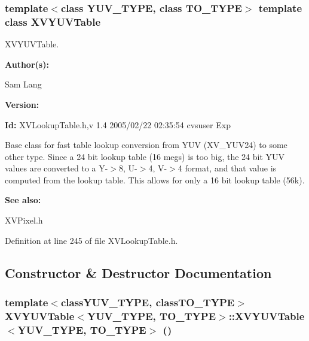 \subsubsection*{template$<$class YUV\_\-TYPE, class TO\_\-TYPE$>$  template class XVYUVTable}

XVYUVTable.

\begin{Desc}
\item[{\bf Author(s): }]\par
 Sam Lang \end{Desc}
\begin{Desc}
\item[{\bf Version: }]\par
 \end{Desc}
\begin{Desc}
\item[{\bf Id: }] XVLookup\-Table.h,v 1.4 2005/02/22 02:35:54 cvsuser Exp \end{Desc}


Base class for fast table lookup conversion from YUV (XV\_\-YUV24) to some other type. Since a 24 bit lookup table (16 megs) is too big, the 24 bit YUV values are converted to a Y-$>$8, U-$>$4, V-$>$4 format, and that value is computed from the lookup table. This allows for only a 16 bit lookup table (56k).

\begin{Desc}
\item[{\bf See also: }]\par
 XVPixel.h \end{Desc}




Definition at line 245 of file XVLookup\-Table.h.

\subsection{Constructor \& Destructor Documentation}
\label{XVYUVTable_a0}
\hypertarget{class_XVYUVTable_a0}{
\subsubsection[XVYUVTable]{\setlength{\rightskip}{0pt plus 5cm}template$<$classYUV\_\-TYPE, classTO\_\-TYPE$>$ XVYUVTable$<$YUV\_\-TYPE, TO\_\-TYPE$>$::XVYUVTable$<$YUV\_\-TYPE, TO\_\-TYPE$>$ ()}}




